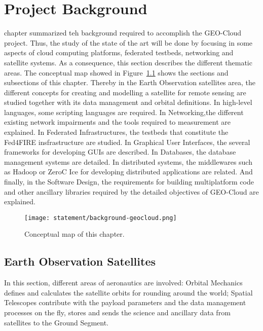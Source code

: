 \chapter{Project Background}
\label{chap:antecedentes}


 chapter summarized teh background required to accomplish the
GEO-Cloud project. Thus, the study of the state of the art will be done by
focusing in some aspects of cloud computing platforms, federated testbeds,
networking and satellite systems. As a consequence, this section describes the different thematic areas.
The conceptual map showed in Figure~\ref{fig:intr-conceptual-map} shows the
sections and subsections of this chapter. Thereby in the Earth Observation
satellites area, the different concepts for creating and modelling a satellite
for remote sensing are studied together with its data management and orbital
definitions. In high-level languages, some scripting languages are required. In
Networking,the different existing network impairments and the tools required to
measurement are explained. In Federated Infrastructures, the testbeds that
constitute the Fed4FIRE insfrastructure are studied. In Graphical User Interfaces, the several
frameworks for developing \acp{GUI} are described. In Databases, the database
management systems are detailed. In distributed systems, the middlewares such as Hadoop or
ZeroC Ice for developing distributed applications are related. And finally, in
the Software Design, the requirements for building multiplatform code and other
ancillary libraries required by the detailed objectives of GEO-Cloud are explained.

\begin{figure}[!h]
\begin{center}
\texttt{[image: statement/background-geocloud.png]}
\caption{Conceptual map of this chapter.}
\label{fig:intr-conceptual-map}
\end{center}
\end{figure}


\section{Earth Observation Satellites}

In this section, different areas of aeronautics are involved: Orbital
Mechanics defines and calculates the satellite orbits for rounding around
the world;  Spatial Telescopes  contribute with the payload parameters and the
data management processes on the fly, stores and sends the science and ancillary
data from satellites to the Ground Segment.

